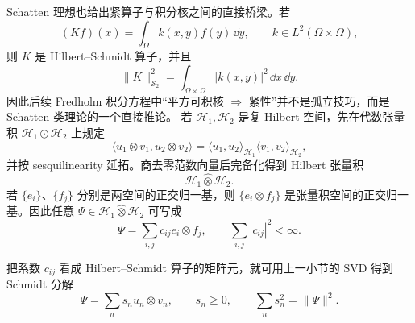 Schatten 理想也给出紧算子与积分核之间的直接桥梁。若
\[
(Kf)(x)=\int_\Omega k(x,y)f(y)\,\dd y,
\qquad
k\in L^2(\Omega\times\Omega),
\]
则 $K$ 是 Hilbert--Schmidt 算子，并且
\[
\|K\|_{\mathcal S_2}^2
=\int_{\Omega\times\Omega}|k(x,y)|^2\,\dd x\,\dd y.
\]
因此后续 Fredholm 积分方程中``平方可积核 $\Rightarrow$ 紧性''并不是孤立技巧，而是 Schatten 类理论的一个直接推论。
若 $\mathcal H_1,\mathcal H_2$ 是复 Hilbert 空间，先在代数张量积 $\mathcal H_1\odot\mathcal H_2$ 上规定
\[
\langle u_1\otimes v_1,u_2\otimes v_2\rangle
=
\langle u_1,u_2\rangle_{\mathcal H_1}
\langle v_1,v_2\rangle_{\mathcal H_2},
\]
并按 sesquilinearity 延拓。商去零范数向量后完备化得到 Hilbert 张量积
\[
\mathcal H_1\widehat\otimes\mathcal H_2.
\]
若 $\{e_i\}$、$\{f_j\}$ 分别是两空间的正交归一基，则 $\{e_i\otimes f_j\}$ 是张量积空间的正交归一基。因此任意 $\Psi\in\mathcal H_1\widehat\otimes\mathcal H_2$ 可写成
\[
\Psi=\sum_{i,j}c_{ij}e_i\otimes f_j,
\qquad
\sum_{i,j}|c_{ij}|^2<\infty.
\]

把系数 $c_{ij}$ 看成 Hilbert--Schmidt 算子的矩阵元，就可用上一小节的 SVD 得到 Schmidt 分解
\begin{equation}
\Psi=\sum_n s_n u_n\otimes v_n,
\qquad
s_n\ge0,
\qquad
\sum_n s_n^2=\|\Psi\|^2.
\label{eq:hilbert-schmidt-schmidt}
\end{equation}

